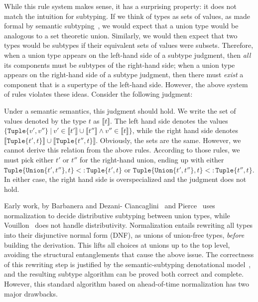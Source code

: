 \documentclass[a4paper,english]{lipics-v2019}
\newcommand{\xt}[1]{\texttt{#1}}
\newcommand{\union}[2]{\xt{Union\{}#1,#2\xt{\}}}
\newcommand{\sub}{<:}
\newcommand{\tuple}[1]{\xt{Tuple\{}#1\xt{\}}}
\begin{document}
\noindent While this rule system makes sense, it has a  surprising
property: it  does not match the intuition for subtyping. If we think
of types as sets of values, as made formal by semantic
subtyping~\cite{Pierce1991}, we would expect that a union type would be
analogous to a set theoretic union. Similarly, we would then expect that two
types would be subtypes if their equivalent sets of values were subsets.
Therefore, when a union type appears on the left-hand side of a subtype
judgment, then \emph{all} its components must be subtypes of the right-hand
side; when a union type appears on the right-hand side of a subtype judgment,
then there must \emph{exist} a component that is a supertype of the left-hand
side. However, the above system of rules violates these ideas. Consider the
following judgment:

%
\vspace{-3mm}{\small\[
\tuple{\union{t'}{t''}, t} \ \ \sub\ \ \union{\tuple{t', t}}{\tuple{t'', t}} 
\]}
\vspace{-3mm}
%

\noindent  Under a semantic semantics, this judgment should hold. We write the
set of values denoted by the type $t$ as {\small $\llbracket t \rrbracket$}.
The left hand side denotes the values {\small $\{\tuple{v',v''} ~|~ v' \in
\llbracket t' \rrbracket \cup \llbracket t'' \rrbracket \wedge v'' \in
\llbracket t \rrbracket\}$}, while the right hand side denotes {\small $\llbracket
\tuple{t', t} \rrbracket \cup \llbracket \tuple{t'', t} \rrbracket$}.
Obviously, the sets are the same. However, we cannot derive this relation from
the above rules. According to those rules, we must pick either {\small $t'$}
or {\small $t''$} for the right-hand union, ending up with either {\small
$\tuple{\union{t'}{t''}, t} \sub \tuple{t', t}$} or {\small
$\tuple{\union{t'}{t''}, t} \sub \tuple{t'', t}$}. In either case, the right
hand side is overspecialized and the judgment does not hold.

Early work, by Barbanera and Dezani-
Ciancaglini~\cite{barbanera1991intersection} and Pierce~\cite{Pierce1991} uses
normalization to decide distributive subtyping between union types, while
Vouillon~\cite{Vouillon04} does not handle distributivity. Normalization
entails rewriting all types into their disjunctive normal form (DNF), as
unions of union-free types, \emph{before} building the derivation. This lifts
all choices at unions up to the top level, avoiding the structural
entanglements that cause the above issue. The correctness of this rewriting
step is justified by the semantic-subtyping denotational
model~\cite{Frisch08}, and the resulting subtype algorithm can be proved both
correct and complete. However, this standard algorithm based on ahead-of-time
normalization has two major drawbacks.  
\end{document}
